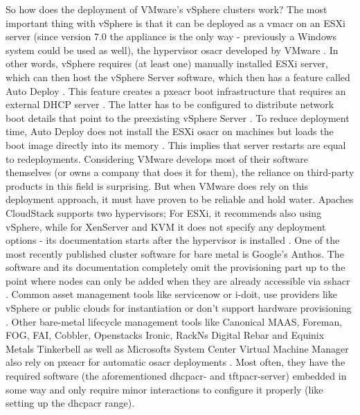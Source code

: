 So how does the deployment of VMware's vSphere clusters work? The most important thing with vSphere is that it can be deployed as a \gls{vmacr} on an ESXi server (since version 7.0 the appliance is the only way - previously a Windows system could be used as well), the hypervisor \gls{osacr} developed by VMware \cite{vmware_farewell_windows} \cite{vmware_vsphere_installation} \cite{vmware_vcenter_deployment}. In other words, vSphere requires (at least one) manually installed ESXi server, which can then host the vSphere Server software, which then has a feature called Auto Deploy \cite{vmware_installing_esxi}. This feature creates a \gls{pxeacr} boot infrastructure that requires an external DHCP server \cite{vmware_intro_autodeploy} \cite{vmware_autodeploy_process}. The latter has to be configured to distribute network boot details that point to the preexisting vSphere Server \cite{vmware_intro_autodeploy}.
To reduce deployment time, Auto Deploy does not install the ESXi \gls{osacr} on machines but loads the boot image directly into its memory \cite{vmware_provisioning_esxi_using_autodeploy}. This implies that server restarts are equal to redeployments.
\newline
Considering VMware develops most of their software themselves (or owns a company that does it for them), the reliance on third-party products in this field is surprising. But when VMware does rely on this deployment approach, it must have proven to be reliable and hold water. %
Apaches CloudStack supports two hypervisors; For ESXi, it recommends also using vSphere, while for XenServer and KVM it does not specify any deployment options - its documentation starts after the hypervisor is installed \cite{cloudstack_installation}.
\newline
One of the most recently published cluster software for bare metal is Google's Anthos. The software and its documentation completely omit the provisioning part up to the point where nodes can only be added when they are already accessible via \gls{sshacr} \cite{anthos_bare_metal}.
\newline
Common asset management tools like servicenow or i-doit, use providers like vSphere or public clouds for instantiation \cite{servicenow_setup_guide_vmware_cloud} or don't support hardware provisioning \cite{idoit_vm_provisioning}.
\newline
Other bare-metal lifecycle management tools like Canonical MAAS, Foreman, FOG, FAI, Cobbler, Openstacks Ironic, RackNs Digital Rebar and Equinix Metals Tinkerbell as well as Microsofts System Center Virtual Machine Manager also rely on \gls{pxeacr} for automatic \gls{osacr} deployments \cite{maas_how_it_works} \cite{foreman_what_is} \cite{fog_introduction} \cite{fai_how_does_it_work} \cite{cobbler_documentation} \cite{openstack_ironic_docs} \cite{rackn_what_is_digital_rebar} \cite{tinkerbell_architecture} \cite{microsoft_provision_hyperv_bare_metal}. Most often, they have the required software (the aforementioned \gls{dhcpacr}- and \gls{tftpacr}-server) embedded in some way and only require minor interactions to configure it properly (like setting up the \gls{dhcpacr} range).
